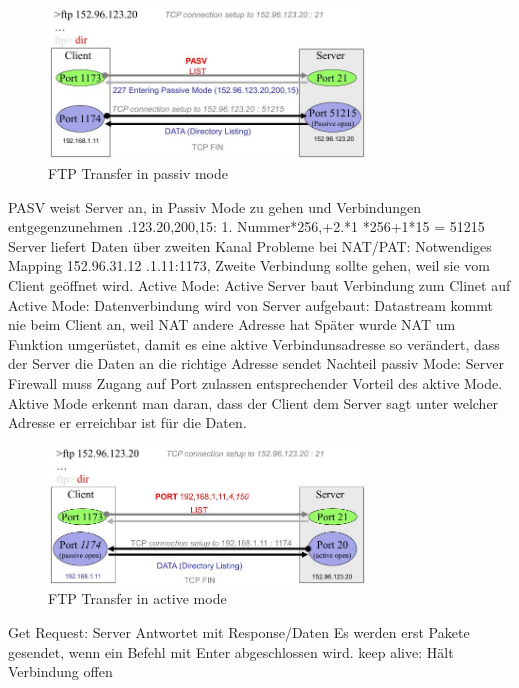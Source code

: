 \documentclass[ngerman,a4paper,12pt]{scrreprt}
\begin{document}
\begin{figure}[H]
	\centering
	\includegraphics[width=0.75\textwidth]{img/V14.5.jpg}
	\caption{FTP Transfer in passiv mode}
	\label{}
\end{figure}

\ul
	\li PASV weist Server an, in Passiv Mode zu gehen und Verbindungen entgegenzunehmen
	.123.20,200,15: 1. Nummer*256,+2.*1 *256+1*15 = 51215
	\li Server liefert Daten über zweiten Kanal
	\li Probleme bei NAT/PAT: Notwendiges Mapping 152.96.31.12 .1.11:1173, Zweite Verbindung sollte gehen, weil sie vom Client geöffnet wird.
	\li Active Mode: Active Server baut Verbindung zum Clinet auf
	\li Active Mode: Datenverbindung wird von Server aufgebaut: Datastream kommt nie beim Client an, weil NAT andere Adresse hat
	\li Später wurde NAT um Funktion umgerüstet, damit es eine aktive Verbindunsadresse so verändert, dass der Server die Daten an die richtige Adresse sendet
	\li Nachteil passiv Mode: Server Firewall muss Zugang auf Port zulassen \ra entsprechender Vorteil des aktive Mode.
	\li Aktive Mode erkennt man daran, dass der Client dem Server sagt unter welcher Adresse er erreichbar ist für die Daten.
\ulE

\begin{figure}[H]
	\centering
	\includegraphics[width=0.75\textwidth]{img/V14.6.jpg}
	\caption{FTP Transfer in active mode}
	\label{}
\end{figure}


\ul
	\li Get Request: Server Antwortet mit Response/Daten
	\li Es werden erst Pakete gesendet, wenn ein Befehl mit Enter abgeschlossen wird.
	\li keep alive: Hält Verbindung offen
\ulE
\end{document}
